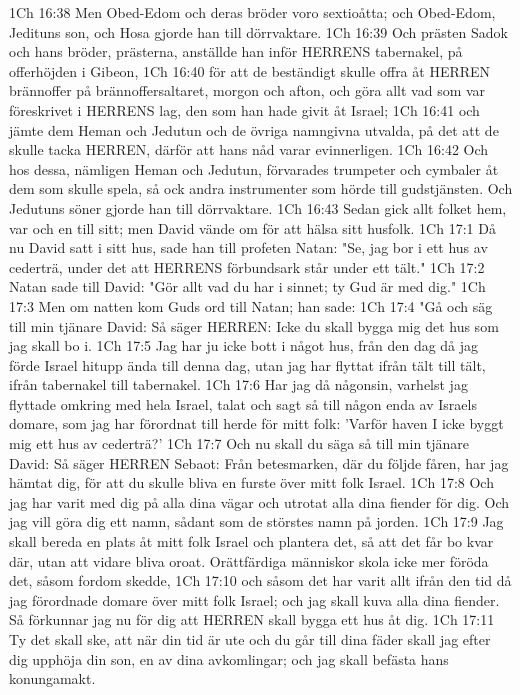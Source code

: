 1Ch 16:38  Men Obed-Edom och deras bröder voro sextioåtta; och Obed-Edom, Jedituns son, och Hosa gjorde han till dörrvaktare.
1Ch 16:39  Och prästen Sadok och hans bröder, prästerna, anställde han inför HERRENS tabernakel, på offerhöjden i Gibeon,
1Ch 16:40  för att de beständigt skulle offra åt HERREN brännoffer på brännoffersaltaret, morgon och afton, och göra allt vad som var föreskrivet i HERRENS lag, den som han hade givit åt Israel;
1Ch 16:41  och jämte dem Heman och Jedutun och de övriga namngivna utvalda, på det att de skulle tacka HERREN, därför att hans nåd varar evinnerligen.
1Ch 16:42  Och hos dessa, nämligen Heman och Jedutun, förvarades trumpeter och cymbaler åt dem som skulle spela, så ock andra instrumenter som hörde till gudstjänsten. Och Jedutuns söner gjorde han till dörrvaktare.
1Ch 16:43  Sedan gick allt folket hem, var och en till sitt; men David vände om för att hälsa sitt husfolk.
1Ch 17:1  Då nu David satt i sitt hus, sade han till profeten Natan: "Se, jag bor i ett hus av cederträ, under det att HERRENS förbundsark står under ett tält."
1Ch 17:2  Natan sade till David: "Gör allt vad du har i sinnet; ty Gud är med dig."
1Ch 17:3  Men om natten kom Guds ord till Natan; han sade:
1Ch 17:4  "Gå och säg till min tjänare David: Så säger HERREN: Icke du skall bygga mig det hus som jag skall bo i.
1Ch 17:5  Jag har ju icke bott i något hus, från den dag då jag förde Israel hitupp ända till denna dag, utan jag har flyttat ifrån tält till tält, ifrån tabernakel till tabernakel.
1Ch 17:6  Har jag då någonsin, varhelst jag flyttade omkring med hela Israel, talat och sagt så till någon enda av Israels domare, som jag har förordnat till herde för mitt folk: 'Varför haven I icke byggt mig ett hus av cederträ?'
1Ch 17:7  Och nu skall du säga så till min tjänare David: Så säger HERREN Sebaot: Från betesmarken, där du följde fåren, har jag hämtat dig, för att du skulle bliva en furste över mitt folk Israel.
1Ch 17:8  Och jag har varit med dig på alla dina vägar och utrotat alla dina fiender för dig. Och jag vill göra dig ett namn, sådant som de störstes namn på jorden.
1Ch 17:9  Jag skall bereda en plats åt mitt folk Israel och plantera det, så att det får bo kvar där, utan att vidare bliva oroat. Orättfärdiga människor skola icke mer föröda det, såsom fordom skedde,
1Ch 17:10  och såsom det har varit allt ifrån den tid då jag förordnade domare över mitt folk Israel; och jag skall kuva alla dina fiender. Så förkunnar jag nu för dig att HERREN skall bygga ett hus åt dig.
1Ch 17:11  Ty det skall ske, att när din tid är ute och du går till dina fäder skall jag efter dig upphöja din son, en av dina avkomlingar; och jag skall befästa hans konungamakt.
